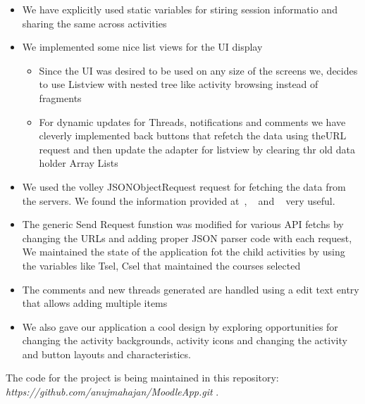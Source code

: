 \documentclass[12pt]{article}
\begin{document}
\begin{itemize}
\item We have explicitly used static variables for stiring session informatio  and sharing the same across activities
\item We implemented some nice list views for the UI display
	\begin{itemize}
		\item Since the UI was desired to be used on any size of the screens we, decides to use Listview with nested tree like activity browsing instead of fragments 
		\item For dynamic updates for Threads, notifications and comments we have cleverly implemented back buttons that refetch the data using theURL request and then update the adapter for listview by clearing thr old data holder Array Lists
	\end{itemize}
\item We used the volley JSONObjectRequest request for fetching the data from the servers. We found the information provided at~\cite{volley_tutorial_1}, ~\cite{volley_tutorial_2} and ~\cite{android_network_tutorial} very useful.
\item The generic Send Request funstion was modified for various API fetchs by changing the URLs and adding proper JSON parser code with each request, We maintained the state of the application fot the child activities by using the variables like Tsel, Csel that maintained the courses selected
\item The comments and new threads generated are handled using a edit text entry that allows adding multiple items
\item We also gave our application a cool design by exploring opportunities for changing the activity backgrounds, activity icons and changing the activity and button layouts and characteristics.
\end{itemize}



The code for the project is being maintained in this repository: {\em \\https://github.com/anujmahajan/MoodleApp.git }.



\end{document}
